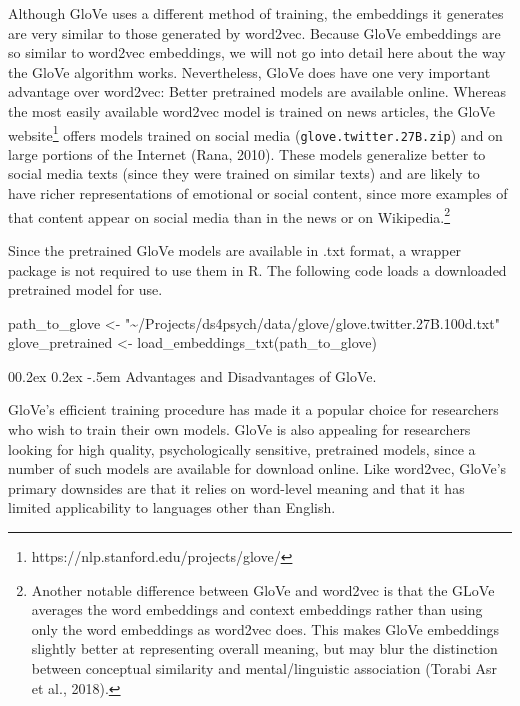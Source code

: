 \documentclass[
  man,
  floatsintext,
  longtable,
  nolmodern,
  notxfonts,
  notimes,
  colorlinks=true,linkcolor=blue,citecolor=blue,urlcolor=blue]{apa7}
\makeatletter
\renewcommand{\paragraph}{\@startsection{paragraph}{4}{\parindent}%
	{0\baselineskip \@plus 0.2ex \@minus 0.2ex}%
	{-.5em}%
	{\normalfont\normalsize\bfseries\typesectitle}}
\newenvironment{Shaded}{\begin{snugshade}}{\end{snugshade}}
\newcommand{\FunctionTok}[1]{\textcolor[rgb]{0.28,0.35,0.67}{#1}}
\newcommand{\NormalTok}[1]{\textcolor[rgb]{0.00,0.23,0.31}{#1}}
\newcommand{\OtherTok}[1]{\textcolor[rgb]{0.00,0.23,0.31}{#1}}
\newcommand{\StringTok}[1]{\textcolor[rgb]{0.13,0.47,0.30}{#1}}
\makeatother
\begin{document}
Although GloVe uses a different method of training, the embeddings it
generates are very similar to those generated by word2vec. Because GloVe
embeddings are so similar to word2vec embeddings, we will not go into
detail here about the way the GloVe algorithm works. Nevertheless, GloVe
does have one very important advantage over word2vec: Better pretrained
models are available online. Whereas the most easily available word2vec
model is trained on news articles, the GloVe website\footnote{https://nlp.stanford.edu/projects/glove/}
offers models trained on social media (\texttt{glove.twitter.27B.zip})
and on large portions of the Internet (Rana, 2010). These models
generalize better to social media texts (since they were trained on
similar texts) and are likely to have richer representations of
emotional or social content, since more examples of that content appear
on social media than in the news or on Wikipedia.\footnote{Another
  notable difference between GloVe and word2vec is that the GLoVe
  averages the word embeddings and context embeddings rather than using
  only the word embeddings as word2vec does. This makes GloVe embeddings
  slightly better at representing overall meaning, but may blur the
  distinction between conceptual similarity and mental/linguistic
  association (Torabi Asr et al., 2018).}

Since the pretrained GloVe models are available in .txt format, a
wrapper package is not required to use them in R. The following code
loads a downloaded pretrained model for use.

\begin{Shaded}
\begin{Highlighting}[]
\NormalTok{path\_to\_glove }\OtherTok{\textless{}{-}} \StringTok{"\textasciitilde{}/Projects/ds4psych/data/glove/glove.twitter.27B.100d.txt"}
\NormalTok{glove\_pretrained }\OtherTok{\textless{}{-}} \FunctionTok{load\_embeddings\_txt}\NormalTok{(path\_to\_glove)}
\end{Highlighting}
\end{Shaded}

\paragraph{Advantages and Disadvantages of
GloVe.}\label{advantages-and-disadvantages-of-glove}

GloVe's efficient training procedure has made it a popular choice for
researchers who wish to train their own models. GloVe is also appealing
for researchers looking for high quality, psychologically sensitive,
pretrained models, since a number of such models are available for
download online. Like word2vec, GloVe's primary downsides are that it
relies on word-level meaning and that it has limited applicability to
languages other than English.
\end{document}
